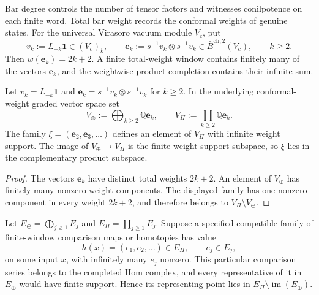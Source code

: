 \begin{remark}
\label{rem:why-weight-filtration}
Bar degree controls the number of tensor factors and witnesses
conilpotence on each finite word.  Total bar weight records the
conformal weights of genuine states.  For the universal Virasoro
vacuum module \(V_c\), put
\[
 v_k:=L_{-k}\mathbf1\in (V_c)_k,
 \qquad
 \mathbf e_k:=s^{-1}v_k\otimes s^{-1}v_k
 \in \bar B^{\mathrm{ch},2}(V_c),
 \qquad k\geq2.
\]
Then \(w(\mathbf e_k)=2k+2\).  A finite total-weight window contains
finitely many of the vectors \(\mathbf e_k\), and the weightwise
product completion contains their infinite sum.
\end{remark}

\begin{lemma}
\label{lem:virasoro-mode-pair-no-raw-limit}
Let \(v_k=L_{-k}\mathbf1\) and
\(\mathbf e_k=s^{-1}v_k\otimes s^{-1}v_k\) for \(k\geq2\).  In the
underlying conformal-weight graded vector space set
\[
 V_\oplus:=\bigoplus_{k\geq2}\mathbb Q\mathbf e_k,
 \qquad
 V_\Pi:=\prod_{k\geq2}\mathbb Q\mathbf e_k.
\]
The family
\(
 \xi=(\mathbf e_2,\mathbf e_3,\ldots)
\)
defines an element of \(V_\Pi\) with infinite weight support.  The
image of \(V_\oplus\to V_\Pi\) is the finite-weight-support subspace,
so \(\xi\) lies in the complementary product subspace.
\end{lemma}

\begin{proof}
The vectors \(\mathbf e_k\) have distinct total weights \(2k+2\).
An element of \(V_\oplus\) has finitely many nonzero weight
components.  The displayed family has one nonzero component in every
weight \(2k+2\), and therefore belongs to \(V_\Pi\setminus V_\oplus\).
\end{proof}

\begin{proposition}
\label{prop:class-m-mode-family-obstruction-package}
Let \(E_\oplus=\bigoplus_{j\geq1}E_j\) and
\(E_\Pi=\prod_{j\geq1}E_j\).  Suppose a specified compatible family
of finite-window comparison maps or homotopies has value
\[
 h(x)=(e_1,e_2,\ldots)\in E_\Pi,
 \qquad e_j\in E_j,
\]
on some input \(x\), with infinitely many \(e_j\) nonzero.  This
particular comparison series belongs to the completed Hom complex,
and every representative of it in \(E_\oplus\) would have finite
support.  Hence its representing point lies in
\(E_\Pi\setminus\operatorname{im}(E_\oplus)\).
\end{proposition}

